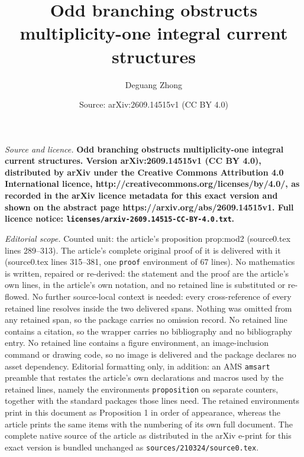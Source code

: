 \documentclass[10pt,a4paper]{amsart}
\title{\bf Odd branching obstructs multiplicity-one integral current structures}
\author{Deguang Zhong}
\date{Source: arXiv:2609.14515v1 (CC BY 4.0)}
\begin{document}
\maketitle

\noindent\emph{Source and licence.} \bf Odd branching obstructs multiplicity-one integral current structures. Version arXiv:2609.14515v1 (CC BY 4.0), distributed by arXiv under the Creative Commons Attribution 4.0 International licence, http://creativecommons.org/licenses/by/4.0/, as recorded in the arXiv licence metadata for this exact version and shown on the abstract page https://arxiv.org/abs/2609.14515v1. Full licence notice: \texttt{licenses/arxiv-2609.14515-CC-BY-4.0.txt}.\par\smallskip

\noindent\textit{Editorial scope.} Counted unit: the article's proposition prop:mod2 (source0.tex lines 289--313). The article's complete original proof of it is delivered with it (source0.tex lines 315--381, one \texttt{proof} environment of 67 lines). No mathematics is written, repaired or re-derived: the statement and the proof are the article's own lines, in the article's own notation, and no retained line is substituted or re-flowed.  No further source-local context is needed: every cross-reference of every retained line resolves inside the two delivered spans.  Nothing was omitted from any retained span, so the package carries no omission record.  No retained line contains a citation, so the wrapper carries no bibliography and no bibliography entry.  No retained line contains a figure environment, an image-inclusion command or drawing code, so no image is delivered and the package declares no asset dependency.  Editorial formatting only, in addition: an AMS \texttt{amsart} preamble that restates the article's own declarations and macros used by the retained lines, namely the environments \texttt{proposition} on separate counters, together with the standard packages those lines need.  The retained environments print in this document as Proposition 1 in order of appearance, whereas the article prints the same items with the numbering of its own full document.  The complete native source of the article as distributed in the arXiv e-print for this exact version is bundled unchanged as \texttt{sources/210324/source0.tex}.
\end{document}

